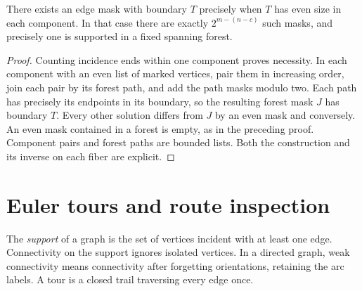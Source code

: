 \begin{corollary}\leavevmode\label{stboundary}
There exists an edge mask with boundary $T$ precisely when $T$ has even size in each component. In that case there are exactly $2^{m-(n-c)}$ such masks, and precisely one is supported in a fixed spanning forest.
\end{corollary}
\begin{proof}
Counting incidence ends within one component proves necessity. In each component with an even list of marked vertices, pair them in increasing order, join each pair by its forest path, and add the path masks modulo two. Each path has precisely its endpoints in its boundary, so the resulting forest mask $J$ has boundary $T$. Every other solution differs from $J$ by an even mask and conversely. An even mask contained in a forest is empty, as in the preceding proof. Component pairs and forest paths are bounded lists. Both the construction and its inverse on each fiber are explicit.
\end{proof}

\section{Euler tours and route inspection}
\label{steuler}
The \emph{support} of a graph is the set of vertices incident with at least one edge. Connectivity on the support ignores isolated vertices. In a directed graph, weak connectivity means connectivity after forgetting orientations, retaining the arc labels. A tour is a closed trail traversing every edge once.

